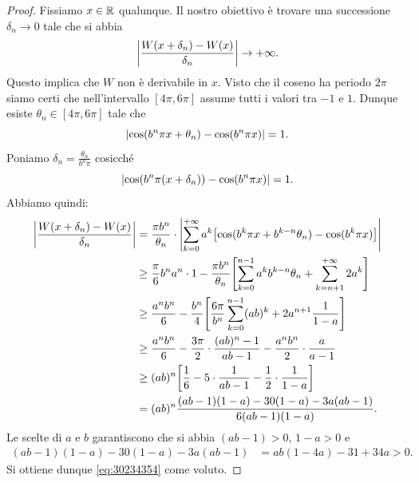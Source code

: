 \begin{proof}
Fissiamo $x\in {\mathbb R}$ qualunque. 
Il nostro obiettivo è trovare una successione $\delta_n\to 0$ 
tale che si abbia
\begin{equation}\label{eq:30234354}
  {\left|\frac{W(x+\delta_n) - W(x)}{\delta_n}\right|} \to +\infty.
\end{equation}
Questo implica che $W$ non è derivabile in $x$.
Visto che il coseno ha periodo $2\pi$ siamo certi che nell'intervallo 
$[4\pi,6\pi]$ assume tutti i valori tra $-1$ e $1$. 
Dunque esiste $\theta_n \in [4\pi,6\pi]$ tale che 
\[
   {\left|\cos (b^n \pi x + \theta_n) - \cos(b^n\pi x)\right|} = 1.
\]
Poniamo $\delta_n = \frac{\theta_n}{b^n \pi}$ cosicché
\[
  {\left|\cos (b^n \pi (x+\delta_n))- \cos(b^n \pi x)\right|} = 1.
\]
Abbiamo quindi:
\begin{align*}
    {\left|\frac{W(x+\delta_n) - W(x)}{\delta_n}\right|} 
    &= \frac{\pi b^n}{\theta_n}\cdot {\left|\sum_{k=0}^{+\infty}a^k{\left[ \cos(b^k\pi x + b^{k-n}\theta_n) - \cos(b^k \pi x) \right]}\right|}  \\
    &\ge \frac{\pi}{6}b^n a^n\cdot 1 - \frac{\pi b^n}{\theta_n}{\left[ \sum_{k=0}^{n-1} a^k b^{k-n} \theta_n + \sum_{k=n+1}^{+\infty} 2a^k \right]} \\
    &\ge \frac{a^n b^n}{6} - \frac{b^n}{4}{\left[ \frac{6\pi}{b^n}\sum_{k=0}^{n-1} (ab)^k + 2 a^{n+1} \frac{1}{1-a} \right]} \\
    &\ge \frac{a^n b^n}{6} -\frac {3\pi} 2\cdot  \frac{(ab)^n-1}{ab-1} - \frac{a^n b^n}{2}\cdot \frac{a}{a-1}\\
    &\ge (ab)^n {\left[ \frac 1 6 - 5\cdot \frac{1}{ab-1} - \frac 1 2 \cdot \frac{1}{1-a} \right]} \\
    &= (ab)^n \frac{(ab-1)(1-a)-30(1-a)-3a(ab-1)}{6(ab-1)(1-a)}.
\end{align*}
Le scelte di $a$ e $b$ garantiscono che
si abbia $(ab-1)>0$, $1-a>0$ e
\begin{align*}
(ab-1)(1-a)-30(1-a)-3a(ab-1)
&= ab(1-4a) - 31 + 34a > 0.
\end{align*}
Si ottiene dunque \eqref{eq:30234354} come voluto.
\end{proof}
